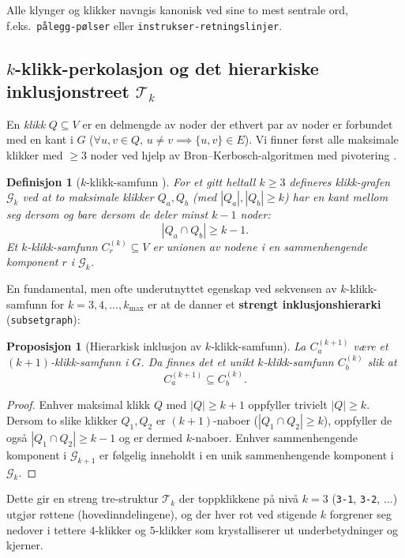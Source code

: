 \documentclass[11pt,a4paper]{article}
\newtheorem{definition}{Definisjon}
\newtheorem{proposition}{Proposisjon}
\begin{document}
Alle klynger og klikker navngis kanonisk ved sine to mest sentrale ord, f.eks.\ \texttt{pålegg-pølser} eller \texttt{instrukser-retningslinjer}.

\subsection{$k$-klikk-perkolasjon og det hierarkiske inklusjonstreet $\mathcal{T}_k$}
En \emph{klikk} $Q \subseteq V$ er en delmengde av noder der ethvert par av noder er forbundet med en kant i $G$ ($\forall u, v \in Q,\, u \ne v \implies \{u, v\} \in E$). Vi finner først alle maksimale klikker med $\ge 3$ noder ved hjelp av Bron--Kerbosch-algoritmen med pivotering \cite{bron1973algorithm}.

\begin{definition}[$k$-klikk-samfunn \cite{palla2005uncovering, everett1998analyzing}]
For et gitt heltall $k \ge 3$ defineres klikk-grafen $\mathcal{G}_k$ ved at to maksimale klikker $Q_a, Q_b$ (med $|Q_a|, |Q_b| \ge k$) har en kant mellom seg dersom og bare dersom de deler minst $k - 1$ noder:
\[
  |Q_a \cap Q_b| \ge k - 1.
\]
Et $k$-klikk-samfunn $C^{(k)}_r \subseteq V$ er unionen av nodene i en sammenhengende komponent $r$ i $\mathcal{G}_k$.
\end{definition}

En fundamental, men ofte underutnyttet egenskap ved sekvensen av $k$-klikk-samfunn for $k = 3, 4, \dots, k_{\max}$ er at de danner et \textbf{strengt inklusjonshierarki} (\texttt{subsetgraph}):

\begin{proposition}[Hierarkisk inklusjon av $k$-klikk-samfunn]
La $C^{(k+1)}_a$ være et $(k+1)$-klikk-samfunn i $G$. Da finnes det et unikt $k$-klikk-samfunn $C^{(k)}_b$ slik at
\[
  C^{(k+1)}_a \subseteq C^{(k)}_b.
\]
\end{proposition}
\begin{proof}
Enhver maksimal klikk $Q$ med $|Q| \ge k+1$ oppfyller trivielt $|Q| \ge k$. Dersom to slike klikker $Q_1, Q_2$ er $(k+1)$-naboer ($|Q_1 \cap Q_2| \ge k$), oppfyller de også $|Q_1 \cap Q_2| \ge k - 1$ og er dermed $k$-naboer. Enhver sammenhengende komponent i $\mathcal{G}_{k+1}$ er følgelig inneholdt i en unik sammenhengende komponent i $\mathcal{G}_k$.
\end{proof}

Dette gir en streng tre-struktur $\mathcal{T}_k$ der toppklikkene på nivå $k=3$ (\texttt{3-1}, \texttt{3-2}, $\dots$) utgjør røttene (hovedinndelingene), og der hver rot ved stigende $k$ forgrener seg nedover i tettere $4$-klikker og $5$-klikker som krystalliserer ut underbetydninger og kjerner.
\end{document}
